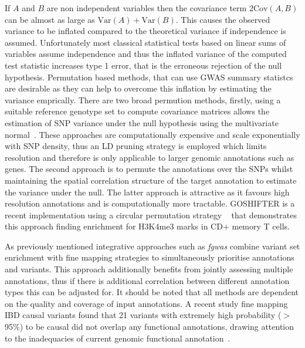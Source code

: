 \documentclass[a4paper,11pt]{report}
\begin{document}
If $A$ and $B$ are non independent variables then the covariance term $2\text{Cov}(A,B)$ can be almost as large as $\text{Var}(A) + \text{Var}(B)$. This causes the observed variance to be inflated compared to the theoretical variance if independence is assumed. Unfortunately most classical statistical tests based on linear sums of variables assume independence and thus the inflated variance of the computed test statistic increases type 1 error, that is the erroneous rejection of the null hypothesis. Permutation based methods, that can use GWAS summary statistcs are desirable as they can help to overcome this inflation by estimating the variance emprically. There are two broad permution methods, firstly, using a suitable reference genotype set to compute covariance matrices allows the estimation of SNP variance under the null hypothesis using the multivariate normal~\cite{LiuMcRaeNyholtEtAl2010,Burren2014-vh}. These approaches are computationally expensive and scale exponentially with SNP density, thus an LD pruning strategy is employed which limits resolution and therefore is only applicable to larger genomic annotations such as genes. The second approach is to permute the annotations over the SNPs whilst maintaining the spatial correlation structure of the target annotation to estimate the variance under the null. The latter approach is attractive as it favours high resolution annotations and is computationally more tractable. GOSHIFTER is a recent implementation using a circular permutation strategy ~\citep{Trynka2015-wz} that demonstrates this approach finding enrichment for H3K4me3 marks in CD$+$ memory T cells. 

As previously mentioned integrative approaches such as \textit{fgwas} combine variant set enrichment with fine mapping strategies to simultaneously prioritise annotations and variants. This approach additionally benefits from jointly assessing multiple annotations, thus if there is additional correlation between different annotation types this can be adjusted for.  It should be noted that all methods are dependent on the quality and coverage of input annotations. A recent study fine mapping IBD causal variants found that 21 variants with extremely high probability ($>$ 95$\%$) to be causal did not overlap any functional annotations, drawing attention to the inadequacies of current genomic functional annotation~\citep{Huang2015-ug}.

\end{document}
